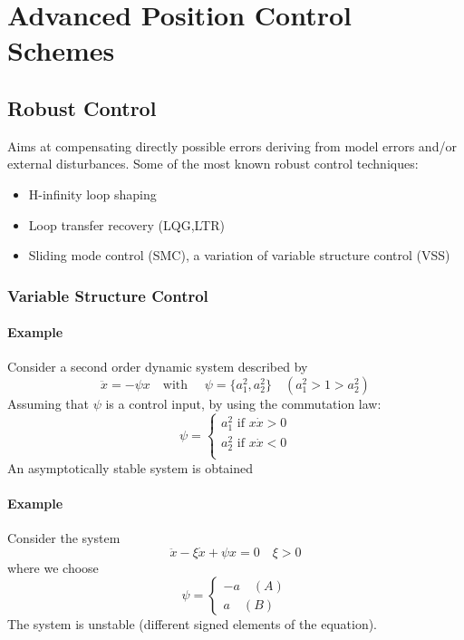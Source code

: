 \documentclass{book}
\begin{document}
\chapter{Advanced Position Control Schemes}









\section{Robust Control}
Aims at compensating directly possible errors deriving from model errors and/or external disturbances. Some of the most known robust control techniques:
\begin{itemize}
    \item H-infinity loop shaping
    \item Loop transfer recovery (LQG,LTR)
    \item Sliding mode control (SMC), a variation of variable structure control (VSS)
\end{itemize}
\subsection{Variable Structure Control}
\subsubsection{Example}
Consider a second order dynamic system described by 
\[
    \ddot{x}=-\psi x \quad \text{with } \quad \psi= \{a_1^2,a_2^2\} \quad (a_1^2>1>a_2^2)
\]
Assuming that $\psi$ is a control input, by using the commutation law:
\[
    \psi=\begin{cases}
        a_1^2 \text{ if } x\dot{x}>0\\
        a_2^2 \text{ if } x\dot{x}<0\\
    \end{cases}
\]
An asymptotically stable system is obtained
\subsubsection{Example}
Consider the system
\[
    \ddot{x}-\xi \dot{x}+\psi x = 0 \quad \xi >0 
\]
where we choose
\[
    \psi = \begin{cases}
        -a \quad (A)\\
        a \quad (B)
    \end{cases}
\]
The system is unstable (different signed elements of the equation).
\end{document}
